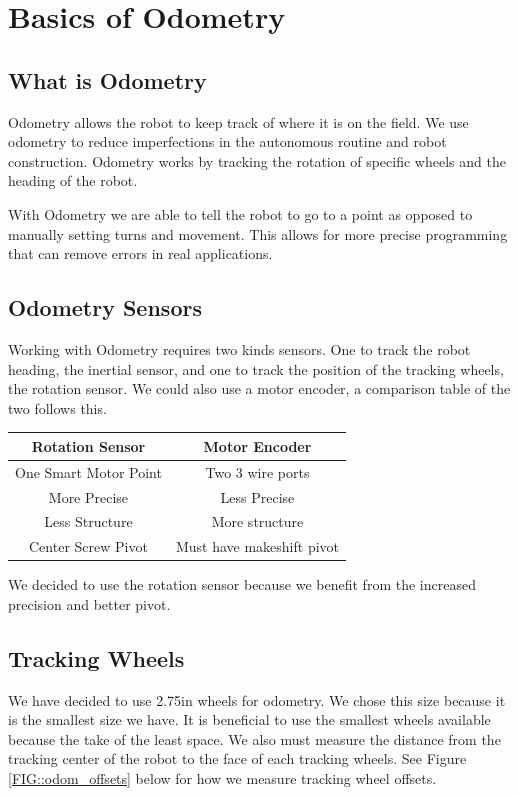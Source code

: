 \documentclass[12pt]{report}
\begin{document}
\section{Basics of Odometry}
\subsection{What is Odometry}
    Odometry allows the robot to keep track of where it is on the field.
    We use odometry to reduce imperfections in the autonomous routine and robot construction.
    Odometry works by tracking the rotation of specific wheels and the heading of the robot.

    With Odometry we are able to tell the robot to go to a point as opposed to manually setting turns and movement.
    This allows for more precise programming that can remove errors in real applications.

\subsection{Odometry Sensors}
    Working with Odometry requires two kinds sensors.
    One to track the robot heading, the inertial sensor, and one to track the position of the tracking wheels, the rotation sensor.
    We could also use a motor encoder, a comparison table of the two follows this.
    \begin{center}
        \begin{tabular}{c|c}
            Rotation Sensor & Motor Encoder \\
            \hline
            One Smart Motor Point & Two 3 wire ports \\
            More Precise & Less Precise \\
            Less Structure & More structure \\
            Center Screw Pivot & Must have makeshift pivot \\
        \end{tabular}

        We decided to use the rotation sensor because we benefit from the increased precision and better pivot.
    \end{center}

\subsection{Tracking Wheels}
We have decided to use 2.75in wheels for odometry.
We chose this size because it is the smallest size we have.
It is beneficial to use the smallest wheels available because the take of the least space.
We also must measure the distance from the tracking center of the robot to the face of each tracking wheels.
See Figure \ref{FIG::odom_offsets} below for how we measure tracking wheel offsets.
\end{document}
